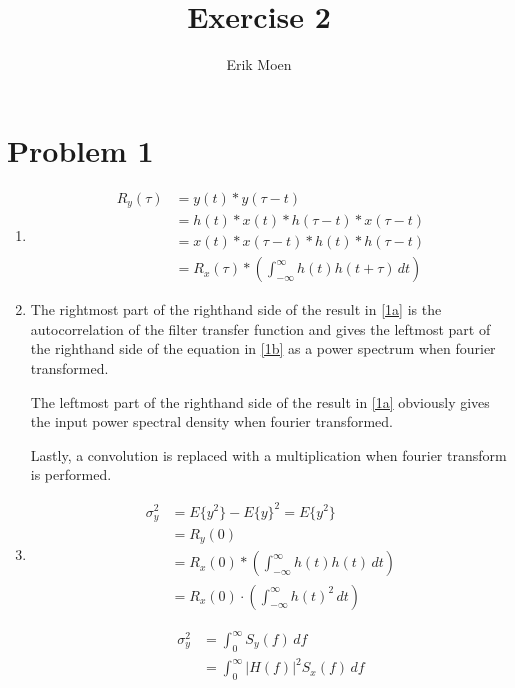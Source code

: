 \documentclass[a4paper, twoside, fleqn]{scrartcl}
\newcommand{\abs}[1]{\ensuremath{\left| #1 \right|}} %
\newcommand{\conv}[0]{\ensuremath{\ast}} %
\begin{document}
\title{Exercise 2}
\subject{TTT4115 Kommunikasjonsteori}
\author{Erik Moen}
\maketitle

\section*{Problem 1}
  \label{1}
  \begin{enumerate}
    \item 
      \label{1a}
      \begin{align}
	R_y(\tau) &= y(t) \conv y(\tau - t) \\
	&= h(t) \conv x(t) \conv h(\tau - t) \conv x(\tau - t) \\
	&= x(t) \conv x(\tau - t) \conv h(t) \conv h(\tau - t) \\
	&= R_x(\tau) \conv \left( \int_{-\infty}^{\infty} h(t) h(t + \tau) \, dt \right)
      \end{align}
    
    \item
      \label{1b}
      The rightmost part of the righthand side of the result in \ref{1a} is the autocorrelation of the filter transfer function and gives the leftmost part of the righthand side of the equation in \ref{1b} as a power spectrum when fourier transformed.
      
      The leftmost part of the righthand side of the result in \ref{1a} obviously gives the input power spectral density when fourier transformed.
      
      Lastly, a convolution is replaced with a multiplication when fourier transform is performed.
      
    \item
      \label{1c}
      \begin{align}
        \sigma_y^2 &= E\{ y^2 \} - E\{y\}^2 = E\{ y^2 \} \\
        &= R_y(0) \\
        &= R_x(0) \conv \left( \int_{-\infty}^{\infty} h(t) h(t) \, dt \right) \\
        &= R_x(0) \cdot \left( \int_{-\infty}^{\infty} h(t)^2 \, dt \right)
      \end{align}
      
      \begin{align}
        \sigma_y^2 &= \int_0^\infty S_y(f) \, df \\
        &= \int_0^\infty \abs{H(f)}^2 S_x(f) \, df
      \end{align}



\end{enumerate}
\end{document}
